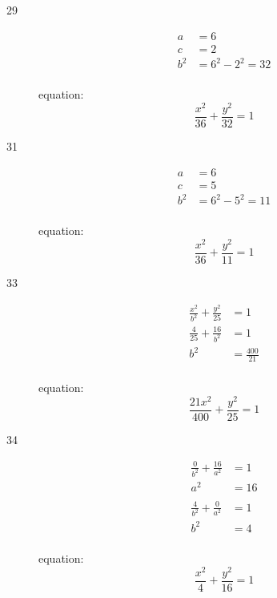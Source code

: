 \documentclass[fleqn,addpoints]{exam}
\begin{document}
\begin{description}

\item[29]
\begin{align*}
  a &= 6 \\
  c &= 2 \\
  b^2 &= 6^2 - 2^2 = 32 \\
\end{align*}

equation:
\[
  \frac{x^2}{36} + \frac{y^2}{32} = 1
\]



\item[31]
\begin{align*}
  a &= 6 \\
  c &= 5 \\
  b^2 &= 6^2 - 5^2 = 11 \\
\end{align*}

equation:
\[
  \frac{x^2}{36} + \frac{y^2}{11} = 1
\]

\item[33]
\begin{align*}
  \frac{x^2}{b^2} + \frac{y^2}{25}  &= 1 \\
  \frac{4}{25} + \frac{16}{b^2} &= 1 \\
  b^2 &= \frac{400}{21} \\
\end{align*}

equation:
\[
  \frac{21 x^2}{400} + \frac{y^2}{25} = 1
\]


\item[34]
\begin{align*}
  \frac{0}{b^2} + \frac{16}{a^2}  &= 1 \\
  a^2 &= 16 \\
  \\
  \frac{4}{b^2} + \frac{0}{a^2}  &= 1 \\
  b^2 &= 4 \\
\end{align*}

equation:
\[
  \frac{x^2}{4} + \frac{y^2}{16} = 1
\]


\end{description}
\end{document}
